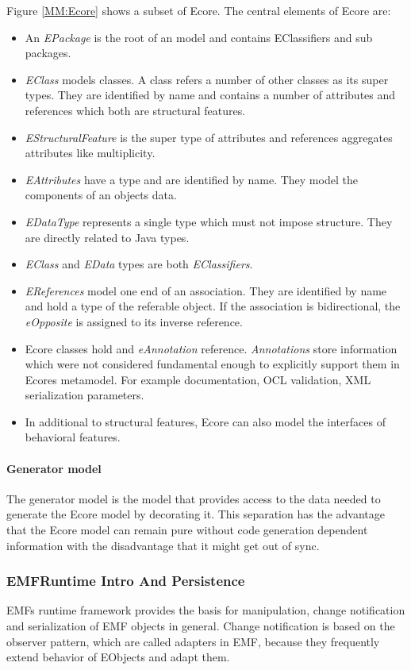 Figure \ref{MM:Ecore} shows a subset of Ecore. The central elements of Ecore are:\\
\begin{itemize}
	\item An \emph{EPackage} is the root of an model and contains EClassifiers and sub packages.
	\item \emph{EClass} models classes. A class refers a number of other classes as its super types. They are identified by name and contains a number of attributes and references which both are structural features.
	\item \emph{EStructuralFeature} is the super type of attributes and references aggregates attributes like multiplicity.
	\item \emph{EAttributes} have a type and are identified by name. They model the components of an objects data.
	\item \emph{EDataType} represents a single type which must not impose structure. They are directly related to Java types.
	\item \emph{EClass} and \emph{EData} types are both \emph{EClassifiers}.
	\item \emph{EReferences} model one end of an association. They are identified by name and hold a type of the referable object. If the association is bidirectional, the \emph{eOpposite} is assigned to its inverse reference. \cite{EMF2nd}
	\item Ecore classes hold and \emph{eAnnotation} reference. \emph{Annotations} store information which were not considered fundamental enough to explicitly support them in Ecores metamodel. For example documentation, OCL validation, XML serialization parameters. \cite{EMP}
	\item In additional to structural features, Ecore can also model the interfaces of behavioral features.
\end{itemize}

\paragraph{Generator model}
The generator model is the model that provides access to the data needed to generate the Ecore model by decorating it. This separation has the advantage that the Ecore model can remain pure without code generation dependent information with the disadvantage that it might get out of sync. \cite{EMF2nd}


\subsubsection{EMFRuntime Intro And Persistence}
EMFs runtime framework provides the basis for manipulation, change notification and serialization of EMF objects in general. \cite{EMF2nd} Change notification is based on the observer pattern, which are called adapters in EMF, because they frequently extend behavior of EObjects and adapt them.

